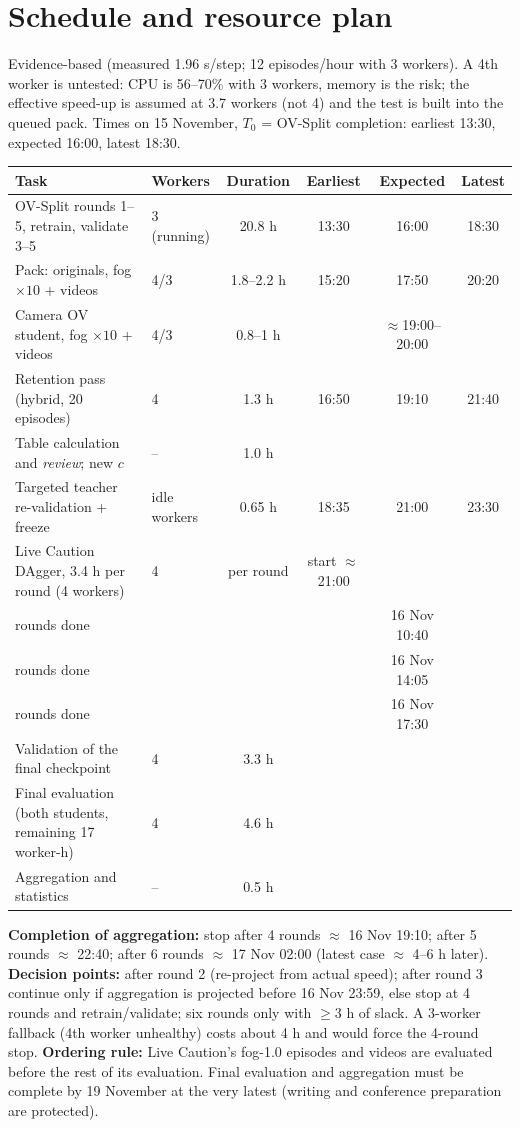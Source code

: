 \documentclass[11pt,a4paper]{article}
\begin{document}
\section{Schedule and resource plan}\label{sec:schedule}
Evidence-based (measured 1.96 s/step; 12 episodes/hour with 3 workers). A 4th worker is untested: CPU is 56--70\% with 3 workers, memory is the risk; the effective speed-up is assumed at 3.7 workers (not 4) and the test is built into the queued pack. Times on 15 November, $T_0$ = OV-Split completion: earliest 13:30, expected 16:00, latest 18:30.
\begin{center}\small\begin{tabular}{@{}p{5.3cm}lcccc@{}}\toprule
Task & Workers & Duration & Earliest & Expected & Latest\\\midrule
OV-Split rounds 1--5, retrain, validate 3--5 & 3 (running) & 20.8 h & 13:30 & 16:00 & 18:30\\
Pack: originals, fog $\times10$ + videos & 4/3 & 1.8--2.2 h & 15:20 & 17:50 & 20:20\\
Camera OV student, fog $\times10$ + videos & 4/3 & 0.8--1 h & & $\approx$19:00--20:00 & \\
Retention pass (hybrid, 20 episodes) & 4 & 1.3 h & 16:50 & 19:10 & 21:40\\
Table calculation and \emph{review}; new $c$ & -- & 1.0 h & & & \\
Targeted teacher re-validation + freeze & idle workers & 0.65 h & 18:35 & 21:00 & 23:30\\
Live Caution DAgger, 3.4 h per round (4 workers) & 4 & per round & start $\approx$21:00 & & \\
\quad 4 rounds done & & & & 16 Nov 10:40 & \\
\quad 5 rounds done & & & & 16 Nov 14:05 & \\
\quad 6 rounds done & & & & 16 Nov 17:30 & \\
Validation of the final checkpoint & 4 & 3.3 h & & & \\
Final evaluation (both students, remaining 17 worker-h) & 4 & 4.6 h & & & \\
Aggregation and statistics & -- & 0.5 h & & & \\\bottomrule\end{tabular}\end{center}
\textbf{Completion of aggregation:} stop after 4 rounds $\approx$ 16 Nov 19:10; after 5 rounds $\approx$ 22:40; after 6 rounds $\approx$ 17 Nov 02:00 (latest case $\approx$ 4--6 h later). \textbf{Decision points:} after round 2 (re-project from actual speed); after round 3 continue only if aggregation is projected before 16 Nov 23:59, else stop at 4 rounds and retrain/validate; six rounds only with $\ge3$ h of slack. A 3-worker fallback (4th worker unhealthy) costs about 4 h and would force the 4-round stop.
\textbf{Ordering rule:} Live Caution's fog-1.0 episodes and videos are evaluated before the rest of its evaluation. Final evaluation and aggregation must be complete by 19 November at the very latest (writing and conference preparation are protected).
\end{document}
